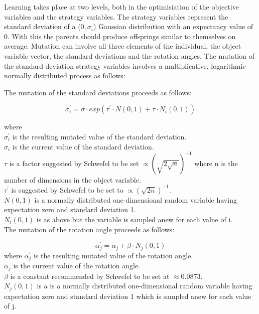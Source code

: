 Learning takes place at two levels, both in the optimisiation of the objective variables and the strategy variables. The strategy variables represent the standard deviation of a ($0,\sigma_i$) Gaussian distribution with an expectancy value of 0. With this the parents should produce offsprings similar to themselves on average.
Mutation can involve all three elements of the individual, the object variable vector, the standard deviations and the rotation angles. The mutation of the standard deviation strategy variables involves a multiplicative, logarithmic normally distributed process as follows:
 
The mutation of the standard deviations proceeds as follows:

\begin{displaymath}
\sigma_i^{'} = \sigma\cdot exp(\tau^{'}\cdot N(0,1) + \tau\cdot N_i(0,1))
\end{displaymath}

where \\
$\sigma_i^{'}$ is the resulting mutated value of the standard deviation. \\
$\sigma_i$ is the current value of the standard deviation. \\
$\tau$ is a factor suggested by Schwefel to be set $\propto (\sqrt{2\sqrt{n}})^{-1}$ where n is the number of dimensions in the object variable. \\
$\tau^{'}$ is suggested by Schwefel to be set to $\propto (\sqrt{2n})^{-1}$. \\
$N(0,1)$ is a normally distributed one-dimensional random variable having expectation zero and standard deviation 1. \\
$N_i(0,1)$ is as above but the variable is sampled anew for each value of i. \\


The mutation of the rotation angle  proceeds as follows:

\begin{displaymath}
\alpha_j^{'} =  \alpha_j + \beta\cdot N_j(0,1)
\end{displaymath}
where
$\alpha_j^{'}$ is the resulting mutated value of the rotation angle. \\
$\alpha_j$ is the current value of the rotation angle. \\
$\beta$ is a constant recommended by Schwefel to be set at $\approx 0.0873$. \\
$N_j(0,1)$ is a is a normally distributed one-dimensional random variable having expectation zero and standard deviation 1 which is sampled anew for each value of j. \\



